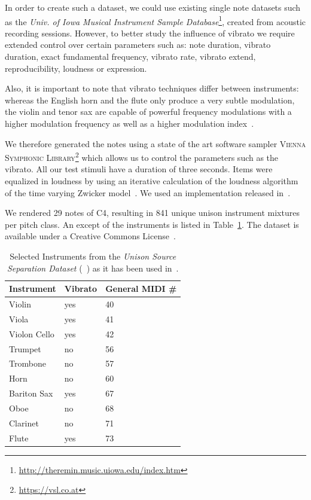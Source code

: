 \par
In order to create such a dataset, we could use existing single note datasets such as the \emph{Univ. of Iowa Musical Instrument Sample Database}\footnote{\url{http://theremin.music.uiowa.edu/index.htm}}, created from acoustic recording sessions.
However, to better study the influence of vibrato we require extended control over certain parameters such as: note duration, vibrato duration, exact fundamental frequency, vibrato rate, vibrato extend, reproducibility, loudness or expression.
\par
Also, it is important to note that vibrato techniques differ between instruments: whereas the English horn and the flute only produce a very subtle modulation, the violin and tenor sax are capable of powerful frequency modulations with a higher modulation frequency as well as a higher modulation index~\cite{gilbert05}.
\par
We therefore generated the notes using a state of the art software sampler \textsc{Vienna Symphonic Library}\footnote{\url{https://vsl.co.at}} which allows us to control the parameters such as the vibrato.
All our test stimuli have a duration of three seconds.
Items were equalized in loudness by using an iterative calculation of the loudness algorithm of the time varying Zwicker model~\cite{zwicker13}. 
We used an implementation released in~\cite{genesis12}. 
\par
We rendered 29 notes of C4, resulting in 841 unique unison instrument mixtures per pitch class.
An except of the instruments is listed in Table~\ref{tab:testset}.
The dataset is available under a Creative Commons License~\cite{oss_unison}.

\begin{table}
\begin{center}
\footnotesize
\begin{tabular}{ l l l}
  Instrument & Vibrato &  General MIDI \# \\
  \hline
  Violin & yes & 40 \\
  Viola & yes & 41 \\
  Violon Cello & yes & 42 \\
  Trumpet & no & 56 \\
  Trombone & no & 57\\
  Horn & no & 60  \\
  Bariton Sax & yes & 67 \\
  Oboe & no & 68\\
  Clarinet & no & 71\\
  Flute & yes & 73\\
\end{tabular}
\end{center}
\caption{Selected Instruments from the \emph{Unison Source Separation Dataset} (~\cite{oss_unison}) as it has been used in~\cite{stoeter14, stoeter16}.}
\label{tab:testset}
\end{table}

